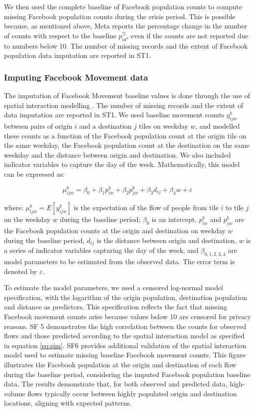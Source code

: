 \documentclass[fleqn,10pt]{wlscirep}
\begin{document}
We then used the complete baseline of Facebook population counts to compute missing Facebook population counts during the crisis period. This is possible because, as mentioned above, Meta reports the percentage change in the number of counts with respect to the baseline $p^{\%}_{id}$, even if the counts are not reported due to numbers below 10. The number of missing records and the extent of Facebook population data imputation are reported in ST1.

\subsubsection*{Imputing Facebook Movement data}

The imputation of Facebook Movement baseline values is done through the use of spatial interaction modelling \cite{rowe2024spatial}. The number of missing records and the extent of data imputation are reported in ST1. We used baseline movement counts $y^b_{ijw}$ between pairs of origin $i$ and a destination $j$ tiles on weekday $w$, and modelled these counts as a function of the Facebook population count at the origin tile on the same weekday, the Facebook population count at the destination on the same weekday and the distance between origin and destination.
We also included indicator variables to capture the day of the week.
Mathematically, this model can be expressed as: 

\begin{equation}\label{eq:sim}
\mu^b_{ijw} = \beta_0 + \beta_1p^b_{iw} +\beta_2p^b_{jw} + \beta_3d_{ij} + \beta_4w + \varepsilon
\end{equation}

where: $\mu^b_{ijw} = E[y^b_{ijw}]$ is the expectation of the flow of people from tile $i$ to tile $j$ on the weekday $w$ during the baseline period; $\beta_0$ is an intercept, $p^b_{iw}$ and $p^b_{jw}$ are the Facebook population counts at the origin and destination on weekday $w$ during the baseline period, $d_{ij}$ is the distance between origin and destination, $w$ is a series of indicator variables capturing the day of the week, and $\beta_{0,1,2,3,4}$ are model parameters to be estimated from the observed data. The error term is denoted by $\varepsilon$.

To estimate the model parameters, we used a censored log-normal model specification, with the logarithm of the origin population, destination population and distance as predictors. This specification reflects the fact that missing Facebook movement counts arise because values below 10 are censored for privacy reasons. SF 5 demonstrates the high correlation between the counts for observed flows and those predicted according to the spatial interaction model as specified in equation \eqref{eq:sim}. SF6 provides additional validation of the spatial interaction model used to estimate missing baseline Facebook movement counts. This figure illustrates the Facebook population at the origin and destination of each flow during the baseline period, considering the imputed Facebook population baseline data. The results demonstrate that, for both observed and predicted data, high-volume flows typically occur between highly populated origin and destination locations, aligning with expected patterns.
\end{document}
